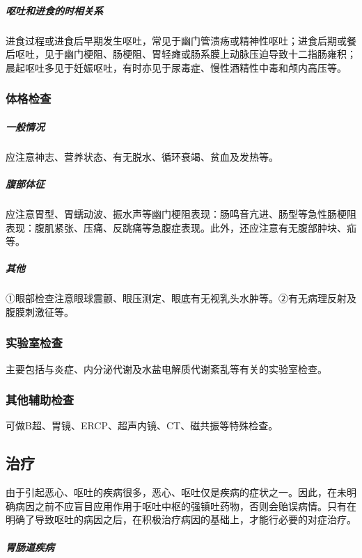 \subparagraph{呕吐和进食的时相关系}

进食过程或进食后早期发生呕吐，常见于幽门管溃疡或精神性呕吐；进食后期或餐后呕吐，见于幽门梗阻、肠梗阻、胃轻瘫或肠系膜上动脉压迫导致十二指肠雍积；晨起呕吐多见于妊娠呕吐，有时亦见于尿毒症、慢性酒精性中毒和颅内高压等。

\subsubsection{体格检查}

\subparagraph{一般情况}

应注意神志、营养状态、有无脱水、循环衰竭、贫血及发热等。

\subparagraph{腹部体征}

应注意胃型、胃蠕动波、振水声等幽门梗阻表现：肠鸣音亢进、肠型等急性肠梗阻表现：腹肌紧张、压痛、反跳痛等急腹症表现。此外，还应注意有无腹部肿块、疝等。

\subparagraph{其他}

①眼部检查注意眼球震颤、眼压测定、眼底有无视乳头水肿等。②有无病理反射及腹膜刺激征等。

\subsubsection{实验室检查}

主要包括与炎症、内分泌代谢及水盐电解质代谢紊乱等有关的实验室检查。

\subsubsection{其他辅助检查}

可做B超、胃镜、ERCP、超声内镜、CT、磁共振等特殊检查。

\subsection{治疗}

由于引起恶心、呕吐的疾病很多，恶心、呕吐仅是疾病的症状之一。因此，在未明确病因之前不应盲目应用作用于呕吐中枢的强镇吐药物，否则会贻误病情。只有在明确了导致呕吐的病因之后，在积极治疗病因的基础上，才能行必要的对症治疗。

\subparagraph{胃肠道疾病}


